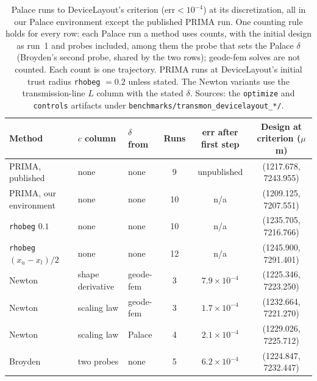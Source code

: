 \documentclass{anvil-paper}
\begin{document}
\begin{table}[htbp]
  \centering
  \caption{Palace runs to DeviceLayout's criterion ($\mathrm{err} <
  10^{-4}$) at its discretization, all in our Palace environment except the
  published PRIMA run. One counting rule
  holds for every row: each Palace run a method uses counts, with the
  initial design as run~1 and probes included, among them the probe that
  sets the Palace $\delta$ (Broyden's second probe, shared by the two rows);
  geode-fem solves are not counted. Each count is one trajectory. PRIMA
  runs at DeviceLayout's initial trust radius \texttt{rhobeg} $= 0.2$
  unless stated. The
  Newton variants use the transmission-line $L$ column with the stated
  $\delta$.
  Sources: the \texttt{optimize} and \texttt{controls} artifacts under
  \texttt{benchmarks/transmon\_devicelayout\_*/}.}
  \label{tab:controls}
  \footnotesize
  \begin{tabular}{@{}lllccc@{}}
    \toprule
    Method & $c$ column & $\delta$ from & Runs & err after first step & Design at criterion ($\mu$m) \\
    \midrule
    PRIMA, published & none & none & 9 & unpublished & (1217.678, 7243.955) \\
    PRIMA, our environment & none & none & 10 & n/a & (1209.125, 7207.551) \\
    \quad \texttt{rhobeg} $0.1$ & none & none & 10 & n/a & (1235.705, 7216.766) \\
    \quad \texttt{rhobeg} $(x_u - x_l)/2$ & none & none & 12 & n/a & (1245.900, 7291.401) \\
    Newton & shape derivative & geode-fem & 3 & $7.9\times10^{-4}$ & (1225.346, 7223.250) \\
    Newton & scaling law & geode-fem & 3 & $1.7\times10^{-4}$ & (1232.664, 7221.270) \\
    Newton & scaling law & Palace & 4 & $2.1\times10^{-4}$ & (1229.026, 7225.712) \\
    Broyden & two probes & none & 5 & $6.2\times10^{-4}$ & (1224.847, 7232.447) \\
    \bottomrule
  \end{tabular}
\end{table}
\end{document}
